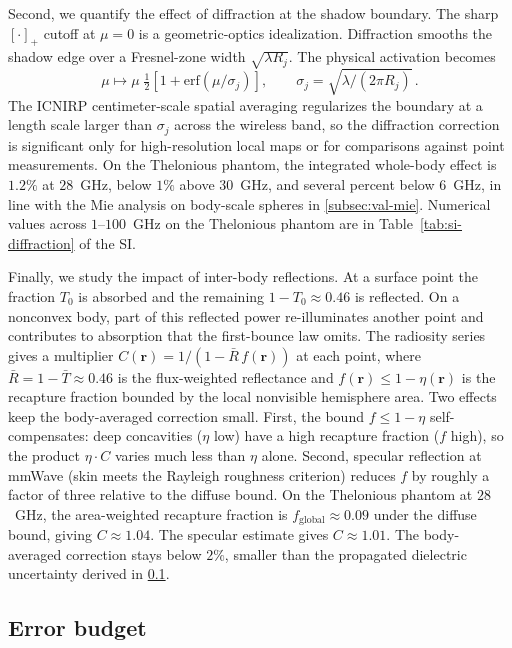 \documentclass[journal,twocolumn,10pt]{IEEEtran}
\newcommand{\rr}{\mathbf{r}}
\newcommand{\Tbar}{\bar{T}}
\begin{document}
Second, we quantify the effect of diffraction at the shadow boundary.
The sharp $[\cdot]_+$ cutoff at $\mu = 0$ is a geometric-optics
idealization. Diffraction smooths the shadow edge over a Fresnel-zone
width $\sqrt{\lambda R_j}$. The physical activation becomes
\begin{equation}\label{eq:gelu}
  \mu \mapsto \mu\;\tfrac{1}{2}\!\left[1 + \mathrm{erf}(\mu/\sigma_j)\right],
  \qquad \sigma_j = \sqrt{\lambda / (2\pi R_j)}\, .
\end{equation}
The \gls{ICNIRP} centimeter-scale spatial
averaging regularizes the boundary at a length scale larger
than $\sigma_j$ across the wireless band, so the diffraction
correction is significant only for high-resolution local maps or
for comparisons against point measurements. On the Thelonious phantom, the integrated whole-body effect is
$1.2\%$ at $28$~GHz, below $1\%$ above $30$~GHz, and several percent
below $6$~GHz, in line with the Mie analysis on body-scale spheres in
\cref{subsec:val-mie}. Numerical values across $1$--$100$~GHz on
the Thelonious phantom are in Table~\ref{tab:si-diffraction} of the SI.

Finally, we study the impact of inter-body reflections. At a surface
point the fraction $T_0$ is absorbed and the remaining
$1 - T_0 \approx 0.46$ is reflected. On a nonconvex body, part of
this reflected power re-illuminates another point and contributes
to absorption that the first-bounce law omits. The radiosity series
gives a multiplier $C(\rr) = 1/(1 - \bar{R}\,f(\rr))$ at each point,
where $\bar{R} = 1 - \Tbar \approx 0.46$ is the flux-weighted
reflectance and $f(\rr) \le 1 - \eta(\rr)$ is the recapture fraction
bounded by the local nonvisible hemisphere area. Two effects keep the
body-averaged correction small. First, the bound $f \le 1 - \eta$
self-compensates: deep concavities ($\eta$ low) have a high recapture
fraction ($f$ high), so the product $\eta\cdot C$ varies much less
than $\eta$ alone. Second, specular reflection at mmWave (skin meets
the Rayleigh roughness criterion) reduces $f$ by roughly a factor of
three relative to the diffuse bound. On the Thelonious phantom at
$28$~GHz, the area-weighted recapture fraction is
$f_{\mathrm{global}} \approx 0.09$ under the diffuse bound, giving
$C \approx 1.04$. The specular estimate gives $C \approx 1.01$. The
body-averaged correction stays below $2\%$, smaller than the
propagated dielectric uncertainty derived in
\cref{subsec:corr-summary}.

\subsection{Error budget}\label{subsec:corr-summary}
\end{document}

